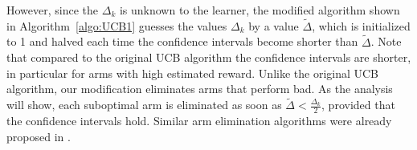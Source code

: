 However, since the $\Delta_k$ is unknown to the learner, the modified algorithm shown in Algorithm~\ref{algo:UCB1} guesses the values $\Delta_k$ by a value $\tilde{\Delta}$, which is initialized to 1 and halved each time the confidence intervals become shorter than $\tilde{\Delta}$. Note that compared to the original UCB algorithm the confidence intervals are shorter, in particular for arms with high estimated reward. Unlike the original UCB algorithm, our modification eliminates arms that perform bad. As the analysis will show, each suboptimal arm is eliminated as soon as $\tilde{\Delta}<\frac{\Delta_k}{2}$, provided that the confidence intervals hold. Similar arm elimination algorithms were already proposed in \cite{even2006action}. 